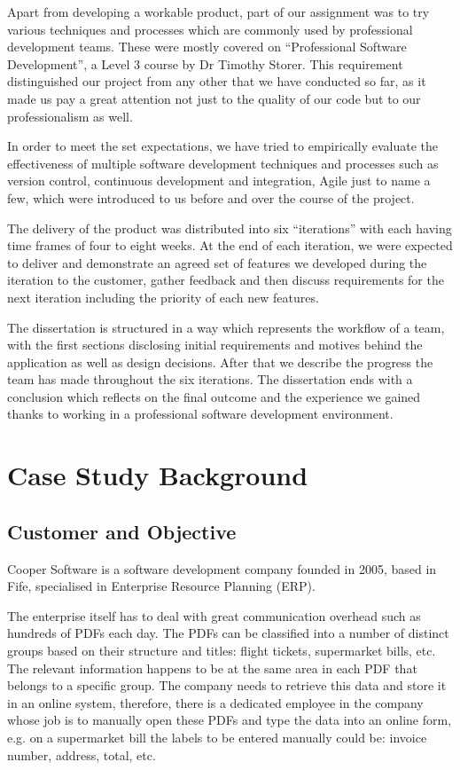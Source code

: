 \documentclass{l3proj}
\begin{document}
Apart from developing a workable product, part of our assignment was to try various techniques and processes which are commonly used by professional development teams. These were mostly covered on ``Professional Software Development'', a Level 3 course by Dr Timothy Storer. This requirement distinguished our project from any other that we have conducted so far, as it made us pay a great attention not just to the quality of our code but to our professionalism as well.

In order to meet the set expectations, we have tried to empirically evaluate the effectiveness of multiple software development techniques and processes such as version control, continuous development and integration, Agile  just to name a few, which were introduced to us before and over the course of the project. 

The delivery of the product was distributed into six ``iterations'' with each having time frames of four to eight weeks. At the end of each iteration, we were expected to deliver and demonstrate an agreed set of features we developed during the iteration to the customer, gather feedback and then discuss requirements for the next iteration including the priority of each new features.

The dissertation is structured in a way which represents the workflow of a team, with the first sections disclosing initial requirements and motives behind the application as well as design decisions. After that we describe the progress the team has made throughout the six iterations. The dissertation ends with a conclusion which reflects on the final outcome and the experience we gained thanks to working in a professional software development environment.


\section{Case Study Background}
\subsection{Customer and Objective}

Cooper Software is a software development company founded in 2005, based in Fife, specialised in Enterprise Resource Planning (ERP).

The enterprise itself has to deal with great communication overhead such as hundreds of PDFs each day. The PDFs can be classified into a number of distinct groups based on their structure and titles: flight tickets, supermarket bills, etc. The relevant information happens to be at the same area in each PDF that belongs to a specific group. The company needs to retrieve this data and store it in an online system, therefore, there is a dedicated employee in the company whose job is to manually open these PDFs and type the data into an online form, e.g. on a supermarket bill the labels to be entered manually could be: invoice number, address, total, etc.
\end{document}
